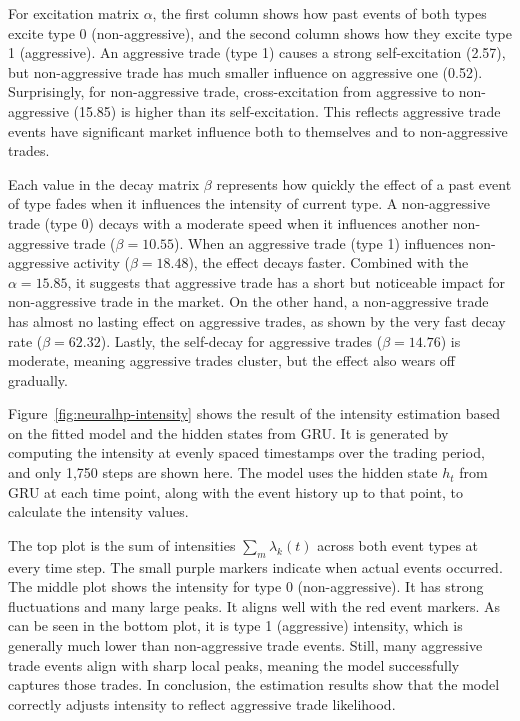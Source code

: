 For excitation matrix $\alpha$, the first column shows how past events of both types excite type 0 (non-aggressive), and the second column shows how they excite type 1 (aggressive). An aggressive trade (type 1) causes a strong self-excitation (2.57), but non-aggressive trade has much smaller influence on aggressive one (0.52). Surprisingly, for non-aggressive trade, cross-excitation from aggressive to non-aggressive (15.85) is higher than its self-excitation. This reflects aggressive trade events have significant market influence both to themselves and to non-aggressive trades.

Each value in the decay matrix $\beta$ represents how quickly the effect of a past event of type fades when it influences the intensity of current type. A non-aggressive trade (type 0) decays with a moderate speed when it influences another non-aggressive trade (\( \beta = 10.55 \)). When an aggressive trade (type 1) influences non-aggressive activity (\( \beta = 18.48 \)), the effect decays faster. Combined with the $\alpha = 15.85$, it suggests that aggressive trade has a short but noticeable impact for non-aggressive trade in the market. On the other hand, a non-aggressive trade has almost no lasting effect on aggressive trades, as shown by the very fast decay rate (\( \beta = 62.32 \)). Lastly, the self-decay for aggressive trades (\( \beta = 14.76 \)) is moderate, meaning aggressive trades cluster, but the effect also wears off gradually.


Figure~\ref{fig:neuralhp-intensity} shows the result of the intensity estimation based on the fitted model and the hidden states from GRU. It is generated by computing the intensity at evenly spaced timestamps over the trading period, and only 1,750 steps are shown here. The model uses the hidden state $h_t$ from GRU at each time point, along with the event history up to that point, to calculate the intensity values. 

The top plot is the sum of intensities $\sum_{m} \lambda_k(t)$ across both event types at every time step. The small purple markers indicate when actual events occurred. The middle plot shows the intensity for type 0 (non-aggressive). It has strong fluctuations and many large peaks. It aligns well with the red event markers. As can be seen in the bottom plot, it is type 1 (aggressive) intensity, which is generally much lower than non-aggressive trade events. Still, many aggressive trade events align with sharp local peaks, meaning the model successfully captures those trades. In conclusion, the estimation results show that the model correctly adjusts intensity to reflect aggressive trade likelihood.

